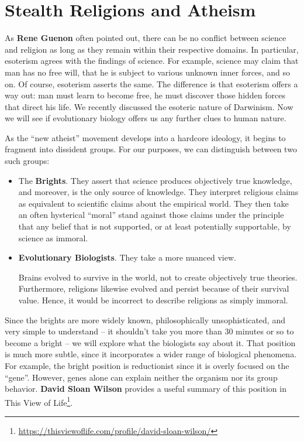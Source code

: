 \section{Stealth Religions and Atheism}

As \textbf{Rene Guenon} often pointed out, there can be no conflict between science and religion as long as they remain within their respective domains. In particular, esoterism agrees with the findings of science. For example, science may claim that man has no free will, that he is subject to various unknown inner forces, and so on. Of course, esoterism asserts the same. The difference is that esoterism offers a way out: man must learn to become free, he must discover those hidden forces that direct his life. We recently discussed the esoteric nature of Darwinism. Now we will see if evolutionary biology offers us any further clues to human nature.

As the ``new atheist'' movement develops into a hardcore ideology, it begins to fragment into dissident groups. For our purposes, we can distinguish between two such groups:

\begin{itemize}


\item The \textbf{Brights}. They assert that science produces objectively true knowledge, and moreover, is the only source of knowledge. They interpret religious claims as equivalent to scientific claims about the empirical world. They then take an often hysterical ``moral'' stand against those claims under the principle that any belief that is not supported, or at least potentially supportable, by science as immoral.

\item \textbf{Evolutionary Biologists}. They take a more nuanced view.

Brains evolved to survive in the world, not to create objectively true theories. Furthermore, religions likewise evolved and persist because of their survival value. Hence, it would be incorrect to describe religions as simply immoral.
\end{itemize}


Since the brights are more widely known, philosophically unsophisticated, and very simple to understand -- it shouldn't take you more than 30 minutes or so to become a bright -- we will explore what the biologists say about it. That position is much more subtle, since it incorporates a wider range of biological phenomena. For example, the bright position is reductionist since it is overly focused on the ``gene''. However, genes alone can explain neither the organism nor its group behavior. \textbf{David Sloan Wilson} provides a useful summary of this position in This View of Life\footnote{\url{https://thisviewoflife.com/profile/david-sloan-wilson/}}.

